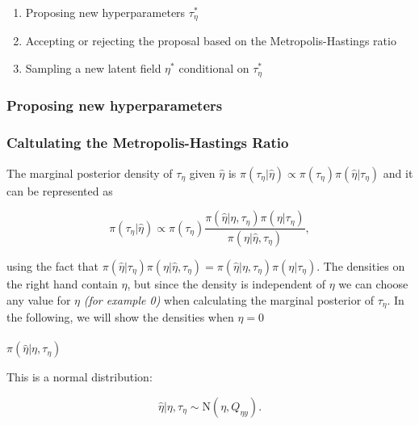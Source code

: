 \documentclass[
  letterpaper,
  DIV=11,
  numbers=noendperiod]{scrartcl}
\makeatletter
\let\oldparagraph\paragraph
\renewcommand{\paragraph}{
    \@ifstar
      \xxxParagraphStar
      \xxxParagraphNoStar
  }
\newcommand{\xxxParagraphStar}[1]{\oldparagraph*{#1}\mbox{}}
\newcommand{\xxxParagraphNoStar}[1]{\oldparagraph{#1}\mbox{}}
\providecommand{\tightlist}{%
  \setlength{\itemsep}{0pt}\setlength{\parskip}{0pt}}\usepackage{longtable,booktabs,array}
\makeatother
\begin{document}
\begin{enumerate}
\def\labelenumi{\arabic{enumi}.}
\tightlist
\item
  Proposing new hyperparameters \(\tau_\eta^*\)
\item
  Accepting or rejecting the proposal based on the Metropolis-Hastings
  ratio
\item
  Sampling a new latent field \(\eta^*\) conditional on \(\tau_\eta^*\)
\end{enumerate}

\subsubsection{Proposing new
hyperparameters}\label{proposing-new-hyperparameters}

\subsubsection{Caltulating the Metropolis-Hastings
Ratio}\label{caltulating-the-metropolis-hastings-ratio}

The marginal posterior density of \(\tau_\eta\) given \(\hat \eta\) is
\(\pi(\tau_\eta\vert\hat\eta) \propto \pi(\tau_\eta)\pi(\hat\eta\vert\tau_\eta)\)
and it can be represented as

\[
\pi(\tau_\eta \vert \hat \eta) \propto \pi(\tau_\eta) \frac{\pi(\hat \eta \vert \eta, \tau_\eta)\pi(\eta \vert \tau_\eta)}{\pi(\eta \vert \hat \eta, \tau_\eta)},
\]

using the fact that
\(\pi(\hat\eta \vert \tau_\eta)\pi(\eta\vert\hat\eta, \tau_\eta) = \pi(\hat\eta\vert\eta,\tau_\eta)\pi(\eta\vert\tau_\eta)\).
The densities on the right hand contain \(\eta\), but since the density
is independent of \(\eta\) we can choose any value for \(\eta\)
\emph{(for example 0)} when calculating the marginal posterior of
\(\tau_\eta\). In the following, we will show the densities when
\(\eta = 0\)

\paragraph{\texorpdfstring{\(\pi(\hat \eta \vert \eta, \tau_\eta)\)}{\textbackslash pi(\textbackslash hat \textbackslash eta \textbackslash vert \textbackslash eta, \textbackslash tau\_\textbackslash eta)}}\label{pihat-eta-vert-eta-tau_eta}

This is a normal distribution:

\[
\hat\eta\vert\eta, \tau_\eta \sim \mathrm{N}(\eta, Q_{\eta y}).
\]
\end{document}
